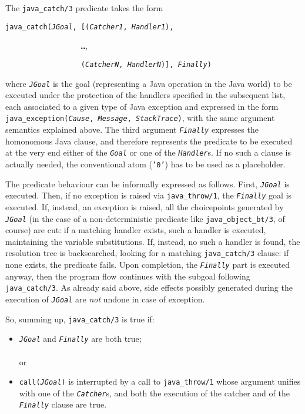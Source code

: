 The \texttt{java\_catch/3} predicate takes the form
\medskip

 \texttt{java\_catch(\textit{JGoal}, [(\textit{Catcher1}, \textit{Handler1}),}

 \texttt{\mbox{~~~~~~~~~~~~~~~~~~}\ldots},

 \texttt{\mbox{~~~~~~~~~~~~~~~~~~}(\textit{CatcherN}, \textit{HandlerN})], \textit{Finally})}

\medskip
\noindent where \texttt{\textit{JGoal}} is the goal (representing a Java operation in the Java
world) to be executed under the protection of the handlers specified in the subsequent list, each
associated to a given type of Java exception and expressed in the form
\texttt{java\_exception(\textit{Cause}, \textit{Message}, \textit{StackTrace})}, with the same
argument semantics explained above. The third argument \texttt{\textit{Finally}} expresses the
homonomous Java clause, and therefore represents the predicate to be executed at the very end
either of the \texttt{\textit{Goal}} or one of the \texttt{\textit{Handler}}s. If no such a clause
is actually needed, the conventional atom (\texttt{'0'}) has to be used as a placeholder.

The predicate behaviour can be informally expressed as follows. First, \textit{\texttt{JGoal}} is
executed. Then, if no exception is raised via \texttt{java\_throw/1}, the
\texttt{\textit{Finally}} goal is executed. If, instead, an exception is raised, all the
choicepoints generated by \textit{\texttt{JGoal}} (in the case of a non-deterministic predicate
like \texttt{java\_object\_bt/3}, of course) are cut: if a matching handler exists, such a handler
is executed, maintaining the variable substitutions. If, instead, no such a handler is found, the
resolution tree is backsearched, looking for a matching \texttt{java\_catch/3} clause: if none
exists, the predicate fails. Upon completion, the \texttt{\textit{Finally}} part is executed
anyway, then the program flow continues with the subgoal following \texttt{java\_catch/3}. As
already said above, side effects possibly generated during the execution of
\textit{\texttt{JGoal}} are \textit{not} undone in case of exception.

So, summing up, \texttt{java\_catch/3} is true if:
\begin{itemize}
  \item \texttt{\textit{JGoal}} and \texttt{\textit{Finally}} are both true;\\\\or
  \item \texttt{call(\textit{JGoal})} is interrupted by a call to \texttt{java\_throw/1} whose
      argument unifies with one of the \texttt{\textit{Catcher}}s, and both the execution of
      the catcher and of the \texttt{\textit{Finally}} clause are true.
\end{itemize}

